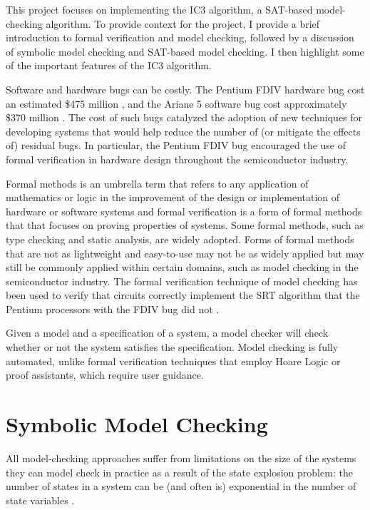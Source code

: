 \documentclass[12pt,a4paper,twoside,openright]{report}
\begin{document}
This project focuses on implementing the IC3 algorithm, a SAT-based model-checking
algorithm.
To provide context for the project,
I provide a brief introduction to formal verification and model checking, followed
by a discussion of symbolic model checking and SAT-based model checking.
I then highlight some of the important features of the IC3 algorithm.

Software and hardware bugs can be costly. The Pentium FDIV hardware bug cost an
estimated \$475 million \cite{pratt95}, and the Ariane 5 software bug cost
approximately \$370 million \cite{dowson97}.
The cost of such bugs catalyzed the adoption of new techniques for developing systems
that would help reduce the number of (or mitigate the effects of) residual bugs.
In particular, the Pentium FDIV bug encouraged the use of formal verification in
hardware design throughout the semiconductor industry.

Formal methods is an umbrella term that refers to any application of mathematics or logic
in the improvement of the design or implementation of hardware or software systems
and formal verification is a form of formal methods that that focuses on proving
properties of systems.
Some formal methods, such as type checking and static analysis, are widely
adopted. Forms of formal methods that are not as lightweight and easy-to-use
may not be as widely applied but may still be commonly applied within certain
domains, such as model checking in the semiconductor industry.
The formal verification technique of model
checking has been used to verify that circuits correctly implement the SRT
algorithm that the Pentium processors with the FDIV bug did not \cite{clarke96}.

Given a model and a specification of a system, a model checker will check whether or
not the system satisfies the specification.
Model checking is fully automated, unlike formal verification techniques that employ
Hoare Logic or proof assistants, which require user guidance.

\section{Symbolic Model Checking}

All model-checking approaches suffer from limitations on the size
of the systems they can model check in practice as a result of
the state explosion problem: the number of
states in a system can be (and often is) exponential in the
number of state variables \cite{clarke12}. 
\end{document}
